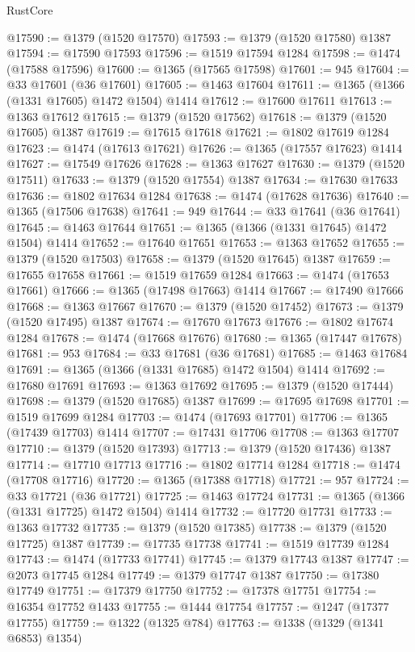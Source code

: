\begin{lexlean}{RustCore}
\begin{coremodule}
@17590 := @1379 (@1520 @17570)
@17593 := @1379 (@1520 @17580) @1387
@17594 := @17590 @17593
@17596 := @1519 @17594 @1284
@17598 := @1474 (@17588 @17596)
@17600 := @1365 (@17565 @17598)
@17601 := 945
@17604 := @33 @17601 (@36 @17601)
@17605 := @1463 @17604
@17611 := @1365 (@1366 (@1331 @17605) @1472 @1504) @1414
@17612 := @17600 @17611
@17613 := @1363 @17612
@17615 := @1379 (@1520 @17562)
@17618 := @1379 (@1520 @17605) @1387
@17619 := @17615 @17618
@17621 := @1802 @17619 @1284
@17623 := @1474 (@17613 @17621)
@17626 := @1365 (@17557 @17623) @1414
@17627 := @17549 @17626
@17628 := @1363 @17627
@17630 := @1379 (@1520 @17511)
@17633 := @1379 (@1520 @17554) @1387
@17634 := @17630 @17633
@17636 := @1802 @17634 @1284
@17638 := @1474 (@17628 @17636)
@17640 := @1365 (@17506 @17638)
@17641 := 949
@17644 := @33 @17641 (@36 @17641)
@17645 := @1463 @17644
@17651 := @1365 (@1366 (@1331 @17645) @1472 @1504) @1414
@17652 := @17640 @17651
@17653 := @1363 @17652
@17655 := @1379 (@1520 @17503)
@17658 := @1379 (@1520 @17645) @1387
@17659 := @17655 @17658
@17661 := @1519 @17659 @1284
@17663 := @1474 (@17653 @17661)
@17666 := @1365 (@17498 @17663) @1414
@17667 := @17490 @17666
@17668 := @1363 @17667
@17670 := @1379 (@1520 @17452)
@17673 := @1379 (@1520 @17495) @1387
@17674 := @17670 @17673
@17676 := @1802 @17674 @1284
@17678 := @1474 (@17668 @17676)
@17680 := @1365 (@17447 @17678)
@17681 := 953
@17684 := @33 @17681 (@36 @17681)
@17685 := @1463 @17684
@17691 := @1365 (@1366 (@1331 @17685) @1472 @1504) @1414
@17692 := @17680 @17691
@17693 := @1363 @17692
@17695 := @1379 (@1520 @17444)
@17698 := @1379 (@1520 @17685) @1387
@17699 := @17695 @17698
@17701 := @1519 @17699 @1284
@17703 := @1474 (@17693 @17701)
@17706 := @1365 (@17439 @17703) @1414
@17707 := @17431 @17706
@17708 := @1363 @17707
@17710 := @1379 (@1520 @17393)
@17713 := @1379 (@1520 @17436) @1387
@17714 := @17710 @17713
@17716 := @1802 @17714 @1284
@17718 := @1474 (@17708 @17716)
@17720 := @1365 (@17388 @17718)
@17721 := 957
@17724 := @33 @17721 (@36 @17721)
@17725 := @1463 @17724
@17731 := @1365 (@1366 (@1331 @17725) @1472 @1504) @1414
@17732 := @17720 @17731
@17733 := @1363 @17732
@17735 := @1379 (@1520 @17385)
@17738 := @1379 (@1520 @17725) @1387
@17739 := @17735 @17738
@17741 := @1519 @17739 @1284
@17743 := @1474 (@17733 @17741)
@17745 := @1379 @17743 @1387
@17747 := @2073 @17745 @1284
@17749 := @1379 @17747 @1387
@17750 := @17380 @17749
@17751 := @17379 @17750
@17752 := @17378 @17751
@17754 := @16354 @17752 @1433
@17755 := @1444 @17754
@17757 := @1247 (@17377 @17755)
@17759 := @1322 (@1325 @784)
@17763 := @1338 (@1329 (@1341 @6853) @1354)

\end{coremodule}
\end{lexlean}

